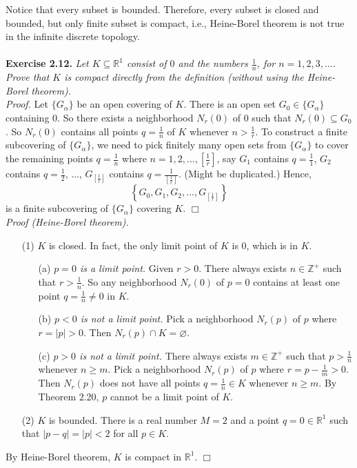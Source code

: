 \documentclass{article}
\begin{document}
Notice that every subset is bounded.
Therefore, every subset is closed and bounded,
but only finite subset is compact, i.e.,
Heine-Borel theorem is not true in the infinite discrete topology. \\\\


\textbf{Exercise 2.12.}
\emph{Let $K \subseteq \mathbb{R}^1$
consist of $0$ and the numbers $\frac{1}{n}$, for $n = 1, 2, 3, ...$.
Prove that $K$ is compact directly from the definition
(without using the Heine-Borel theorem).} \\

\emph{Proof.}
Let $\{ G_{\alpha} \}$ be an open covering of $K$.
There is an open set $G_0 \in \{ G_{\alpha} \}$ containing $0$.
So there exists a neighborhood $N_r(0)$ of $0$ such that $N_r(0) \subseteq G_0$.
So $N_r(0)$ contains all points $q = \frac{1}{n}$ of $K$ whenever $n > \frac{1}{r}$.
To construct a finite subcovering of $\{ G_{\alpha} \}$,
we need to pick finitely many open sets from $\{ G_{\alpha} \}$
to cover the remaining points $q = \frac{1}{n}$ where $n = 1, 2, ..., \left[\frac{1}{r}\right]$,
say $G_1$ contains $q = \frac{1}{1}$, $G_2$ contains $q = \frac{1}{2}$, ...,
$G_{\left[\frac{1}{r}\right]}$ contains $q = \frac{1}{\left[\frac{1}{r}\right]}$.
(Might be duplicated.)
Hence,
$$\left\{ G_0, G_1, G_2, ..., G_{\left[\frac{1}{r}\right]} \right\}$$
is a finite subcovering of $\{ G_{\alpha} \}$ covering $K$.
$\Box$ \\

\emph{Proof (Heine-Borel theorem).}
\begin{enumerate}
\item[(1)]
$K$ is closed. In fact, the only limit point of $K$ is $0$, which is in $K$.
\begin{enumerate}
\item[(a)]
\emph{$p = 0$ is a limit point.}
Given $r > 0$.
There always exists $n \in \mathbb{Z}^{+}$ such that $r > \frac{1}{n}$.
So any neighborhood $N_r(0)$ of $p = 0$
contains at least one point $q = \frac{1}{n} \neq 0$ in $K$.
\item[(b)]
\emph{$p < 0$ is not a limit point.}
Pick a neighborhood $N_{r}(p)$ of $p$ where $r = |p| > 0$.
Then $N_{r}(p) \cap K = \varnothing$.
\item[(c)]
\emph{$p > 0$ is not a limit point.}
There always exists $m \in \mathbb{Z}^+$ such that $p > \frac{1}{n}$ whenever $n \geq m$.
Pick a neighborhood $N_{r}(p)$ of $p$ where $r = p - \frac{1}{m} > 0$.
Then $N_{r}(p)$ does not have all points $q = \frac{1}{n} \in K$ whenever $n \geq m$.
By Theorem 2.20, $p$ cannot be a limit point of $K$.
\end{enumerate}
\item[(2)]
$K$ is bounded. There is a real number $M = 2$ and a point $q = 0 \in \mathbb{R}^1$
such that $|p - q| = |p| < 2$ for all $p \in K$.
\end{enumerate}
By Heine-Borel theorem, $K$ is compact in $\mathbb{R}^1$.
$\Box$ \\\\
\end{document}
